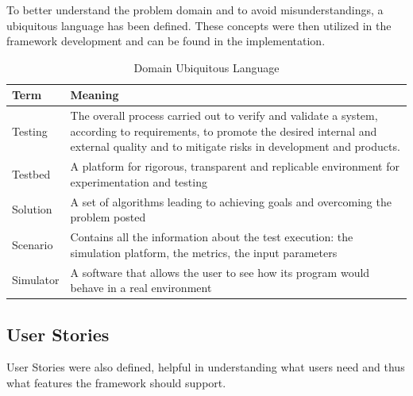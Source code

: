 \documentclass[12pt,a4paper,openright,twoside]{book}
\begin{document}
To better understand the problem domain and to avoid misunderstandings, a ubiquitous language has been defined.
These concepts were then utilized in the framework development and can be found in the implementation.

\begin{table}[H]
    \centering
    \begin{tabular}{|l|p{}|}
    \toprule
    \textbf{Term} & \textbf{Meaning} \\
    \midrule                                                                                                                                                              
    Testing & The overall process carried out to verify and validate a system, according to requirements, to promote the desired internal and external quality and to mitigate risks in development and products. \\ \hline
    Testbed & A platform for rigorous, transparent and replicable environment for experimentation and testing \\ \hline
    Solution & A set of algorithms leading to achieving goals and overcoming the problem posted \\ \hline
    Scenario & Contains all the information about the test execution: the simulation platform, the metrics, the input parameters \\ \hline
    Simulator & A software that allows the user to see how its program would behave in a real environment \\ \hline
    \end{tabular}
    \caption{Domain Ubiquitous Language}
    \end{table}

\subsection*{User Stories}

User Stories were also defined, helpful in understanding what users need and thus what features the framework should support.
\end{document}
